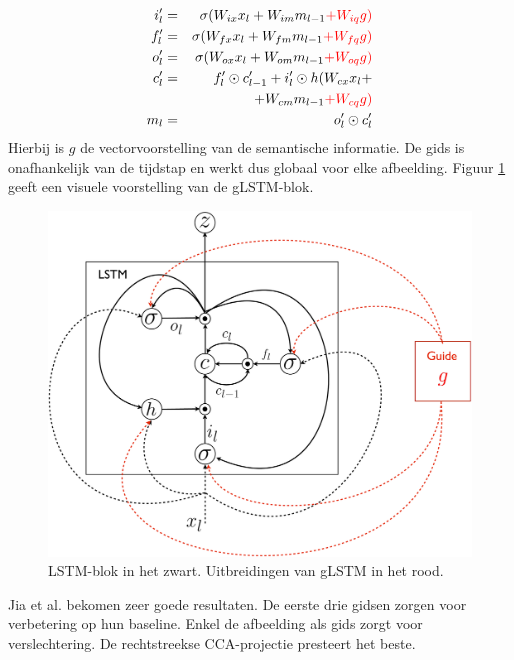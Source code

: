 %
\begin{eqnarray}
\vspace{-3mm}
\label{glstm-memory-start}
i_l' & = & \sigma (W_{ix} x_l + W_{im} m_{l-1} \color{red}{+ W_{iq} g}) \label{glstm-input} \\
f_l' & = & \sigma (W_{fx} x_l + W_{fm} m_{l-1} \color{red}{+ W_{fq} g}) \\
o_l' & = & \sigma (W_{ox} x_l + W_{om} m_{l-1} \color{red}{+ W_{oq} g}) \\
c_l' & = & f_l' \odot c_{l-1}' + i_l' \odot h(W_{cx} x_l + \nonumber \\
&   & + W_{cm} m_{l-1} \color{red}{+ W_{cq} g}) \\
m_l & = & o_l' \odot c_l'
\label{glstm-memory}
\vspace{-3mm}
\end{eqnarray}
Hierbij is $g$ de vectorvoorstelling van de semantische informatie. De gids is onafhankelijk van de tijdstap en werkt dus globaal voor elke afbeelding. Figuur \ref{fig:glstm} geeft een visuele voorstelling van de gLSTM-blok.

\begin{figure}[tb][h]
	\centering
	\includegraphics[width=\linewidth]{Images/glstm.pdf}
	\caption{LSTM-blok in het zwart. Uitbreidingen van gLSTM in het rood.}
	\label{fig:glstm}
\end{figure}

Jia et al. bekomen zeer goede resultaten. De eerste drie gidsen zorgen voor verbetering op hun baseline. Enkel de afbeelding als gids zorgt voor verslechtering. De rechtstreekse CCA-projectie presteert het beste.

